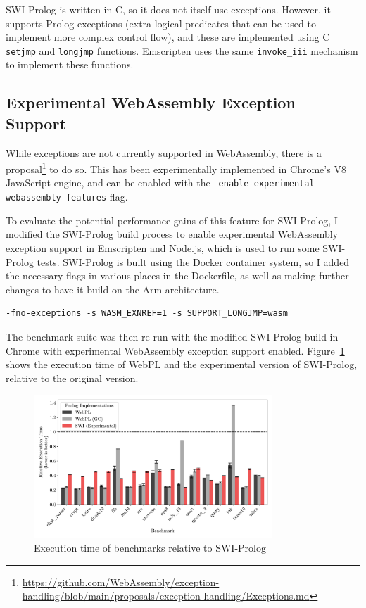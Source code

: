 SWI-Prolog is written in C, so it does not itself use exceptions. However, it supports Prolog exceptions (extra-logical predicates that can be used to implement more complex control flow), and these are implemented using C \texttt{setjmp} and \texttt{longjmp} functions. Emscripten uses the same \texttt{invoke\_iii} mechanism to implement these functions.

\subsection{Experimental WebAssembly Exception Support}

While exceptions are not currently supported in WebAssembly, there is a proposal\footnote{\url{https://github.com/WebAssembly/exception-handling/blob/main/proposals/exception-handling/Exceptions.md}} to do so. This has been experimentally implemented in Chrome's V8 JavaScript engine, and can be enabled with the \texttt{--enable-experimental-webassembly-features} flag.

To evaluate the potential performance gains of this feature for SWI-Prolog, I modified the SWI-Prolog build process to enable experimental WebAssembly exception support in Emscripten and Node.js, which is used to run some SWI-Prolog tests. SWI-Prolog is built using the Docker container system, so I added the necessary flags in various places in the Dockerfile, as well as making further changes to have it build on the Arm architecture.

\vspace*{-1em}

\begin{verbatim}
-fno-exceptions -s WASM_EXNREF=1 -s SUPPORT_LONGJMP=wasm
\end{verbatim}

\vspace*{-1em}

The benchmark suite was then re-run with the modified SWI-Prolog build in Chrome with experimental WebAssembly exception support enabled. Figure~\ref{fig:swi-prolog-exception} shows the execution time of WebPL and the experimental version of SWI-Prolog, relative to the original version.

\begin{figure}[H]
\centering
\includegraphics[width=0.8\textwidth]{relative_performance_exnref.pdf}
\caption{Execution time of benchmarks relative to SWI-Prolog}
\label{fig:swi-prolog-exception}
\end{figure}

